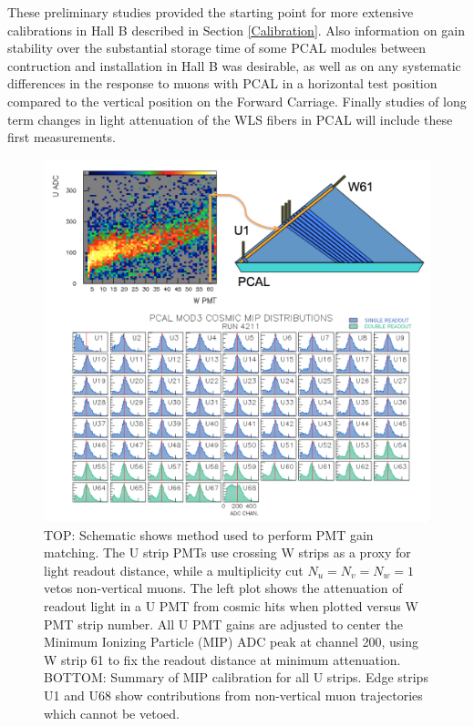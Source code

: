 These preliminary studies provided the starting point for more extensive calibrations in Hall B described in Section \ref{Calibration}.  Also information on gain stability over the substantial storage time of some PCAL modules between contruction and installation in Hall B was desirable, as well as on any systematic differences in the response to muons with PCAL in a horizontal test position compared to the vertical position on the Forward Carriage.  Finally studies of long term changes in light attenuation of the WLS fibers in PCAL will include these first measurements.

\begin{figure}[hbt]
\centering
\includegraphics[width=0.95\columnwidth,keepaspectratio]{img/S5_4.png}
\caption{TOP: Schematic shows method used to perform PMT gain matching.  The U strip PMTs use crossing W strips as a proxy for light readout distance, while a multiplicity cut $N_u=N_v=N_w=1$ vetos non-vertical muons.   The left plot shows the attenuation of readout light in a U PMT from cosmic hits when plotted versus W PMT strip number.  All U PMT gains are adjusted to center the Minimum Ionizing Particle (MIP) ADC peak at channel 200, using W strip 61 to fix the readout distance at minimum attenuation.  BOTTOM: Summary of MIP calibration for all U strips.  Edge strips U1 and U68 show contributions from non-vertical muon trajectories which cannot be vetoed.}
\label{fig:S5_4}
\end{figure}

